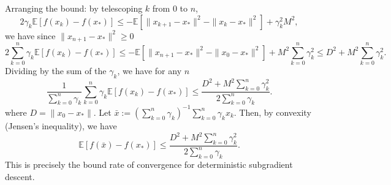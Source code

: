 Arranging the bound: by telescoping $k$ from $0$ to $n$,
\begin{equation}
2\gamma_k\mathbb{E}[f(x_k)-f(x_*)] \leq -\mathbb{E}[\|x_{k+1}-x_*\|^2-\|x_{k}-x_*\|^2] + \gamma_k^2 M^2,
\end{equation}
we have since $\|x_{n+1}-x_*\|^2\geq 0$
\begin{equation}
2\sum_{k=0}^n \gamma_k\mathbb{E}[f(x_k)-f(x_*)] \leq -\mathbb{E}[\|x_{n+1}-x_*\|^2-\|x_{0}-x_*\|^2] + M^2 \sum_{k=0}^{n} \gamma_k^2\leq D^2+M^2  \sum_{k=0}^{n} \gamma_k^2.
\end{equation}
Dividing by the sum of the $\gamma_k$, we have for any $n$
\begin{equation}
\frac{1}{\sum_{k=0}^n \gamma_k}\sum_{k=0}^n \gamma_k\mathbb{E}[f(x_k)-f(x_*)] \leq \frac{D^2+M^2  \sum_{k=0}^{n} \gamma_k^2}{2\sum_{k=0}^n \gamma_k}.
\end{equation}
where $D=\|x_0-x_*\|$. Let $\bar{x}:=(\sum_{k=0}^n \gamma_k)^{-1}\sum_{k=0}^n \gamma_k x_k$. Then, by convexity (Jensen's inequality), we have
\begin{equation}
\mathbb{E}[f(\bar{x})-f(x_*)] \leq \frac{D^2+M^2  \sum_{k=0}^{n} \gamma_k^2}{2\sum_{k=0}^n \gamma_k}.
\end{equation}
This is precisely the bound rate of convergence for deterministic subgradient descent.

